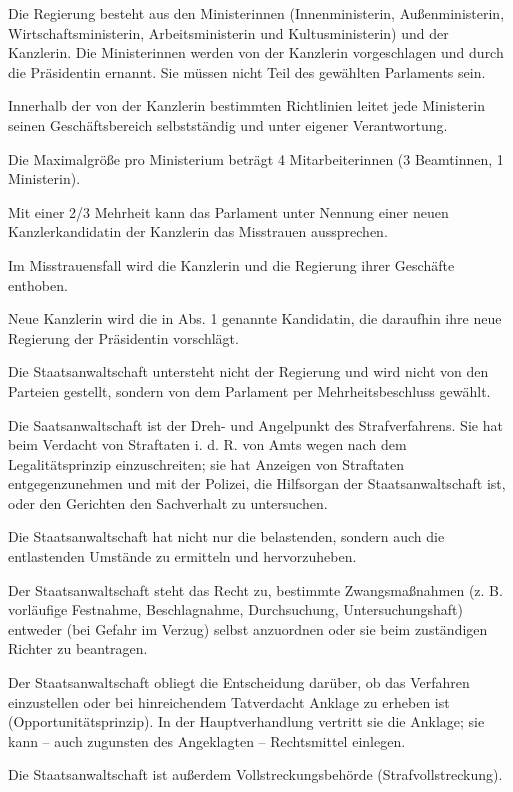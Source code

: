 \documentclass{sasbase}
\begin{document}
\begin{article}[Regierung]
	\item Die Regierung besteht aus den Ministerinnen (Innenministerin, Außenministerin, Wirtschaftsministerin, Arbeitsministerin und Kultusministerin) und der Kanzlerin. Die Ministerinnen werden von der Kanzlerin vorgeschlagen und durch die Präsidentin ernannt. Sie müssen nicht Teil des gewählten Parlaments sein.
	\item Innerhalb der von der Kanzlerin bestimmten Richtlinien leitet jede Ministerin seinen Geschäftsbereich selbstständig und unter eigener Verantwortung.
	\item Die Maximalgröße pro Ministerium beträgt 4 Mitarbeiterinnen (3 Beamtinnen, 1 Ministerin).
\end{article}

\begin{article}
    \item Mit einer 2/3 Mehrheit kann das Parlament unter Nennung einer neuen Kanzlerkandidatin
        der Kanzlerin das Misstrauen aussprechen.
    \item Im Misstrauensfall wird die Kanzlerin und die Regierung ihrer Geschäfte enthoben.
    \item Neue Kanzlerin wird die in Abs. 1 genannte Kandidatin, die daraufhin ihre neue Regierung
        der Präsidentin vorschlägt.
\end{article}

\begin{article}[Staatsanwaltschaft]
	\item Die Staatsanwaltschaft untersteht nicht der Regierung und wird nicht von den Parteien gestellt, sondern von dem Parlament per Mehrheitsbeschluss gewählt.
	\item Die Saatsanwaltschaft ist der Dreh- und Angelpunkt des Strafverfahrens. Sie hat beim Verdacht von Straftaten i. d. R. von Amts wegen nach dem Legalitätsprinzip einzuschreiten; sie hat Anzeigen von Straftaten entgegenzunehmen und mit der Polizei, die Hilfsorgan der Staatsanwaltschaft ist, oder den Gerichten den Sachverhalt zu untersuchen.
	\item Die Staatsanwaltschaft hat nicht nur die belastenden, sondern auch die entlastenden Umstände zu ermitteln und hervorzuheben.
	\item Der Staatsanwaltschaft steht das Recht zu, bestimmte Zwangsmaßnahmen (z. B. vorläufige Festnahme, Beschlagnahme, Durchsuchung, Untersuchungshaft) entweder (bei Gefahr im Verzug) selbst anzuordnen oder sie beim zuständigen Richter zu beantragen.
	\item Der Staatsanwaltschaft obliegt die Entscheidung darüber, ob das Verfahren einzustellen oder bei hinreichendem Tatverdacht Anklage zu erheben ist (Opportunitätsprinzip). In der Hauptverhandlung vertritt sie die Anklage; sie kann – auch zugunsten des Angeklagten – Rechtsmittel einlegen.
	\item Die Staatsanwaltschaft ist außerdem Vollstreckungsbehörde (Strafvollstreckung).
\end{article}
\end{document}
